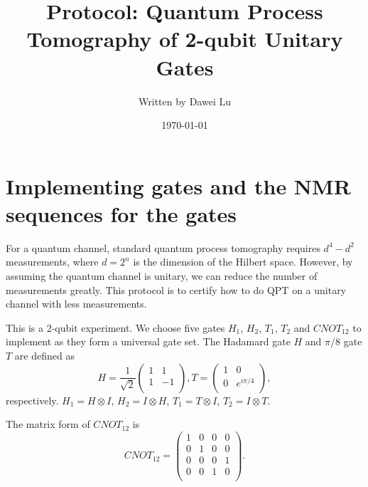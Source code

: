 \documentclass[12pt,nofootinbib,notitlepage,onecolumn,superscriptaddress]{revtex4-1}
\theoremstyle{plain}
\theoremstyle{definition}
\newcommand{\be}{\begin{equation}}
\newcommand{\ee}{\end{equation}}
\begin{document}
\title{Protocol: Quantum Process Tomography of 2-qubit Unitary Gates }
\author{Written by Dawei Lu}

\date{\today}

\maketitle

\section{Implementing gates and the NMR sequences for the gates}
For a quantum channel, standard quantum process tomography requires $d^4-d^2$ measurements, where $d = 2^n$ is the dimension of the Hilbert space. However, by assuming the quantum channel is unitary, we can reduce the number of measurements greatly. This protocol is to certify how to do QPT on a unitary channel with less measurements.

This is a 2-qubit experiment. We choose five gates $H_1$, $H_2$, $T_1$, $T_2$ and $CNOT_{12}$ to implement as they form a universal gate set. The Hadamard gate $H$ and $\pi/8$ gate $T$ are defined as
\be
H = \frac{1}{\sqrt{2}}\left(
                         \begin{array}{cc}
                           1 & 1 \\
                           1 & -1 \\
                         \end{array}
                       \right), T = \left(
                                      \begin{array}{cc}
                                        1 & 0 \\
                                        0 & e^{i\pi/4} \\
                                      \end{array}
                                    \right),
\ee
respectively. $H_1 = H\otimes I$, $H_2 = I\otimes H$, $T_1 = T\otimes I$, $T_2 = I\otimes T$.

The matrix form of $CNOT_{12}$ is 
\be
CNOT_{12} = \left(
              \begin{array}{cccc}
                1 & 0 & 0 & 0 \\
                0 & 1 & 0 & 0 \\
                0 & 0 & 0 & 1 \\
                0 & 0 & 1 & 0 \\
              \end{array}
            \right).
\ee
\end{document}
